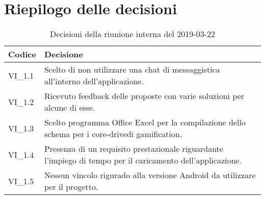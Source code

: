 \section{Riepilogo delle decisioni}

	
	\begin{longtable}{ >{\centering}p{} >{}p{}}
		\caption{Decisioni della riunione interna del 2019-03-22}\\	
		\rowcolorhead
		\textbf{\color{white}Codice} 
		& \centering\textbf{\color{white}Decisione} 
		\tabularnewline 
		\endfirsthead
		VI\_1.1 & Scelto di non utilizzare una chat di messaggistica all'interno dell'applicazione.
		
		\tabularnewline 
		VI\_1.2 & Ricevuto feedback delle proposte con varie soluzioni per alcune di esse.
		
		\tabularnewline 
		VI\_1.3 & Scelto programma Office Excel per la compilazione dello schema per i core-drive\glosp di gamification\glo.
	
		\tabularnewline 
		VI\_1.4 & Presenza di un requisito prestazionale riguardante l'impiego di tempo per il caricamento dell'applicazione.
		
		\tabularnewline 
		VI\_1.5 & Nessun vincolo rigurado alla versione Android da utilizzare per il progetto.
	\end{longtable}
	




